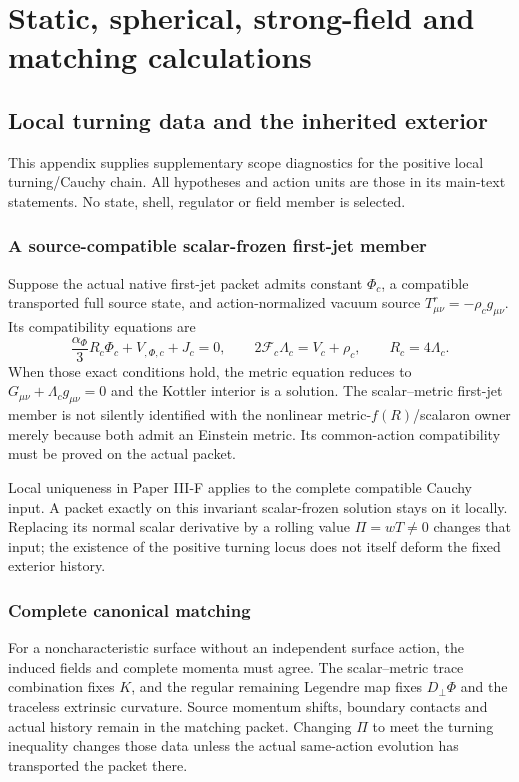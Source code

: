 \documentclass[12pt,a4paper]{article}
\begin{document}
\section{Static, spherical, strong-field and matching calculations}
\label{p6c:sec:c5}
\subsection{Local turning data and the inherited exterior}
\label{p8:app:spherical-continuation-diagnostics}
This appendix supplies supplementary scope diagnostics for the positive
local turning/Cauchy chain. All hypotheses and action units are those in its
main-text statements. No state, shell, regulator or field member is selected.

\subsubsection{A source-compatible scalar-frozen first-jet member}
Suppose the actual native first-jet packet admits constant \(\Phi_c\), a
compatible transported full source state, and action-normalized vacuum source
\(T^r_{\mu\nu}=-\rho_cg_{\mu\nu}\). Its compatibility equations are
\[
 \frac{\alpha_\Phi}{3}R_c\Phi_c+V_{,\Phi,c}+J_c=0,
 \qquad 2\mathscr F_c\Lambda_c=V_c+\rho_c,
 \qquad R_c=4\Lambda_c.
\]
When those exact conditions hold, the metric equation reduces to
\(G_{\mu\nu}+\Lambda_cg_{\mu\nu}=0\) and the Kottler interior is a solution.
The scalar--metric first-jet member is not silently identified with the
nonlinear metric-\(f(R)\)/scalaron owner merely because both admit an
Einstein metric. Its common-action compatibility must be proved on the
actual packet.

Local uniqueness in Paper III-F applies to the complete compatible Cauchy
input. A packet exactly on this invariant scalar-frozen solution stays on
it locally. Replacing its normal scalar derivative by a rolling value
\(\Pi=wT\ne0\) changes that input; the existence of the positive turning
locus does not itself deform the fixed exterior history.

\subsubsection{Complete canonical matching}
For a noncharacteristic surface without an independent surface action, the
induced fields and complete momenta must agree. The scalar--metric trace
combination fixes \(K\), and the regular remaining Legendre map fixes
\(D_\perp\Phi\) and the traceless extrinsic curvature. Source momentum
shifts, boundary contacts and actual history remain in the matching packet.
Changing \(\Pi\) to meet the turning inequality changes those data unless
the actual same-action evolution has transported the packet there.
\end{document}
